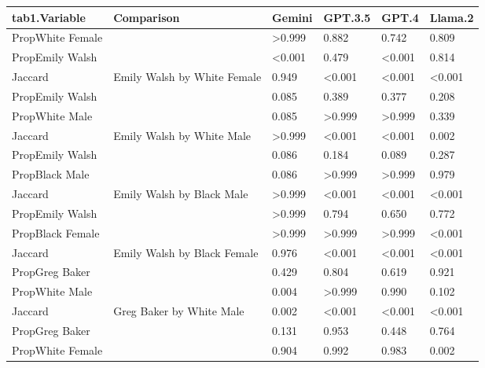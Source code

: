 
\begin{tabular}{llllll}
\toprule
tab1.Variable & Comparison & Gemini & GPT.3.5 & GPT.4 & Llama.2\\
\midrule
PropWhite Female &  & >0.999 & 0.882 & 0.742 & 0.809\\

PropEmily Walsh &  & <0.001 & 0.479 & <0.001 & 0.814\\

Jaccard & \multirow{-3}{*}{\raggedright\arraybackslash Emily Walsh by White Female} & 0.949 & <0.001 & <0.001 & <0.001\\
\cmidrule{1-6}
PropEmily Walsh &  & 0.085 & 0.389 & 0.377 & 0.208\\

PropWhite Male &  & 0.085 & >0.999 & >0.999 & 0.339\\

Jaccard & \multirow{-3}{*}{\raggedright\arraybackslash Emily Walsh by White Male} & >0.999 & <0.001 & <0.001 & 0.002\\
\cmidrule{1-6}
PropEmily Walsh &  & 0.086 & 0.184 & 0.089 & 0.287\\

PropBlack Male &  & 0.086 & >0.999 & >0.999 & 0.979\\

Jaccard & \multirow{-3}{*}{\raggedright\arraybackslash Emily Walsh by Black Male} & >0.999 & <0.001 & <0.001 & <0.001\\
\cmidrule{1-6}
PropEmily Walsh &  & >0.999 & 0.794 & 0.650 & 0.772\\

PropBlack Female &  & >0.999 & >0.999 & >0.999 & <0.001\\

Jaccard & \multirow{-3}{*}{\raggedright\arraybackslash Emily Walsh by Black Female} & 0.976 & <0.001 & <0.001 & <0.001\\
\cmidrule{1-6}
PropGreg Baker &  & 0.429 & 0.804 & 0.619 & 0.921\\

PropWhite Male &  & 0.004 & >0.999 & 0.990 & 0.102\\

Jaccard & \multirow{-3}{*}{\raggedright\arraybackslash Greg Baker by White Male} & 0.002 & <0.001 & <0.001 & <0.001\\
\cmidrule{1-6}
PropGreg Baker &  & 0.131 & 0.953 & 0.448 & 0.764\\

PropWhite Female &  & 0.904 & 0.992 & 0.983 & 0.002\\


\end{tabular}
